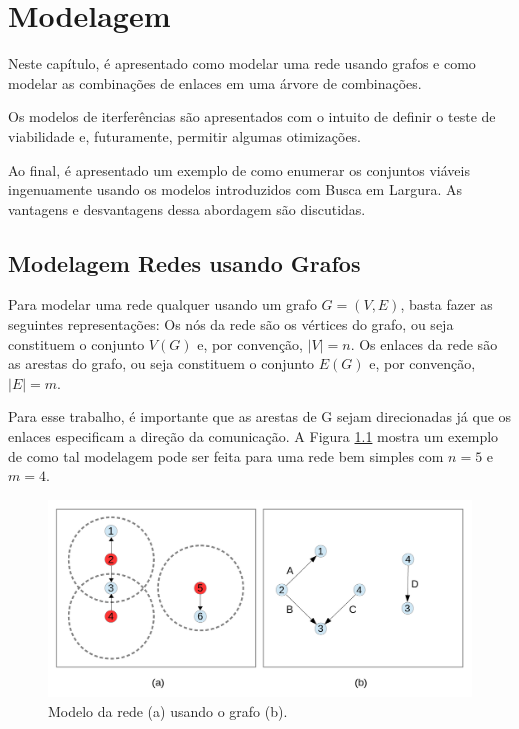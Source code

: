 \chapter{Modelagem}
\label{cap:modelagem}

Neste capítulo, é apresentado como modelar uma rede usando grafos e como modelar as combinações de enlaces em uma árvore de combinações. 

Os modelos de iterferências são apresentados com o intuito de definir o teste de viabilidade e, futuramente, permitir algumas otimizações.

Ao final, é apresentado um exemplo de como enumerar os conjuntos viáveis ingenuamente usando os modelos introduzidos com Busca em Largura. As vantagens e desvantagens dessa abordagem são discutidas.

\section{Modelagem Redes usando Grafos}

Para modelar uma rede qualquer usando um grafo $G=(V,E)$, basta fazer as seguintes representações: Os nós da rede são os vértices do grafo, ou seja constituem o conjunto $V(G)$ e, por convenção, $|V|=n$. Os enlaces da rede são as arestas do grafo, ou seja constituem o conjunto $E(G)$ e, por convenção, $|E|=m$.

Para esse trabalho, é importante que as arestas de G sejam direcionadas já que os enlaces especificam a direção da comunicação. A Figura \ref{fig:grafo} mostra um exemplo de como tal modelagem pode ser feita para uma rede bem simples com $n=5$ e $m=4$.

\begin{figure}[htb]
\centering
\includegraphics[width=1\textwidth]{figs/grafo}
\caption[Modelo da rede (a) usando o grafo (b).]
{Modelo da rede (a) usando o grafo (b).}
\label{fig:grafo}
\end{figure}

